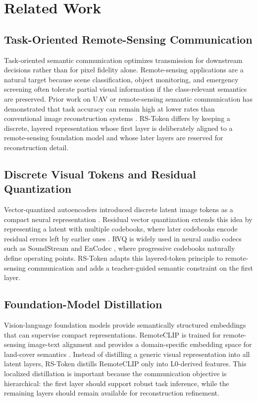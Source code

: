 \documentclass[lettersize,journal]{IEEEtran}
\begin{document}
\section{Related Work}
\subsection{Task-Oriented Remote-Sensing Communication}
Task-oriented semantic communication optimizes transmission for downstream decisions rather than for pixel fidelity alone. Remote-sensing applications are a natural target because scene classification, object monitoring, and emergency screening often tolerate partial visual information if the class-relevant semantics are preserved. Prior work on UAV or remote-sensing semantic communication has demonstrated that task accuracy can remain high at lower rates than conventional image reconstruction systems \cite{gao2022task}. RS-Token differs by keeping a discrete, layered representation whose first layer is deliberately aligned to a remote-sensing foundation model and whose later layers are reserved for reconstruction detail.

\subsection{Discrete Visual Tokens and Residual Quantization}
Vector-quantized autoencoders introduced discrete latent image tokens as a compact neural representation \cite{vqvae}. Residual vector quantization extends this idea by representing a latent with multiple codebooks, where later codebooks encode residual errors left by earlier ones \cite{lee2022residual}. RVQ is widely used in neural audio codecs such as SoundStream and EnCodec \cite{soundstream,encodec}, where progressive codebooks naturally define operating points. RS-Token adapts this layered-token principle to remote-sensing communication and adds a teacher-guided semantic constraint on the first layer.

\subsection{Foundation-Model Distillation}
Vision-language foundation models provide semantically structured embeddings that can supervise compact representations. RemoteCLIP is trained for remote-sensing image-text alignment and provides a domain-specific embedding space for land-cover semantics \cite{liu2024remoteclip}. Instead of distilling a generic visual representation into all latent layers, RS-Token distills RemoteCLIP only into L0-derived features. This localized distillation is important because the communication objective is hierarchical: the first layer should support robust task inference, while the remaining layers should remain available for reconstruction refinement.
\end{document}
